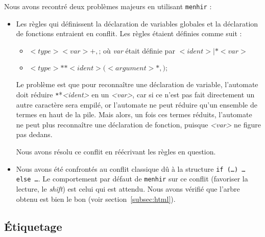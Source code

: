 \documentclass[a4paper]{article}
\begin{document}
Nous avons recontré deux problèmes majeurs en utilisant \texttt{menhir} :
\begin{itemize}
    \item Les règles qui définissent la déclaration de variables globales et la déclaration de fonctions entraient en conflit.
          Les règles étaient définies comme suit :
          \begin{itemize}
              \item $<type> <var>+,\texttt{;}$ où \emph{var} était définie par $<ident> | \texttt{*} <var>$
              \item $<type> \texttt{*}* <ident>\texttt{(} <argument>*, \texttt{);}$
          \end{itemize}
          Le problème est que pour reconnaître une déclaration de variable, l'automate doit réduire \texttt{*}*\emph{<ident>} en un \emph{<var>}, car si ce n'est pas fait directement un autre caractère sera empilé, or l'automate ne peut réduire qu'un ensemble de termes en haut de la pile. Mais alors, un fois ces termes réduits, l'automate ne peut plus reconnaître une déclaration de fonction, puisque \emph{<var>} ne figure pas dedans.

          Nous avons résolu ce conflit en réécrivant les règles en question.

      \item Nous avons été confrontés au conflit classique dû à la structure \texttt{if (…) … else …}.
            Le comportement par défaut de \texttt{menhir} sur ce conflit (favoriser la lecture, le \emph{shift}) est celui qui est attendu. Nous avons vérifié que l'arbre obtenu est bien le bon (voir section~\ref{subsec:html}).

\end{itemize}

\subsection{Étiquetage}
\end{document}
